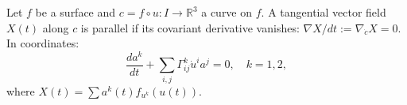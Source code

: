 Let $f$ be a surface and $c = f \circ u: I \to \mathbb{R}^3$ a curve on $f$. A tangential vector field $X(t)$ along $c$ is parallel if its covariant derivative vanishes: $\nabla X/dt := \nabla_{\dot{c}} X = 0$. In coordinates:
$$\frac{d a^k}{dt} + \sum_{i,j} \Gamma_{ij}^k \dot{u}^i a^j = 0, \quad k = 1,2,$$
where $X(t) = \sum a^k(t) f_{u^k}(u(t))$.